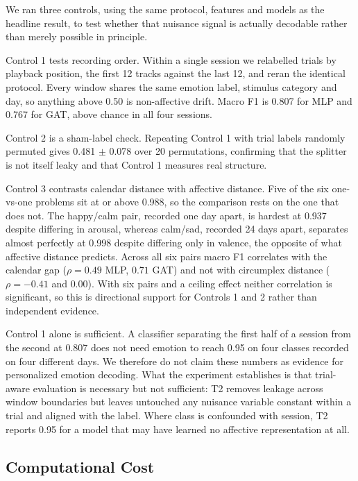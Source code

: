 \documentclass[conference,a4paper]{IEEEtran}
\begin{document}
We ran three controls, using the same protocol, features and models as the headline result, to test whether that nuisance signal is actually decodable rather than merely possible in principle.

Control 1 tests recording order. Within a single session we relabelled trials by playback position, the first 12 tracks against the last 12, and reran the identical protocol. Every window shares the same emotion label, stimulus category and day, so anything above 0.50 is non-affective drift. Macro F1 is 0.807 for MLP and 0.767 for GAT, above chance in all four sessions.

Control 2 is a sham-label check. Repeating Control 1 with trial labels randomly permuted gives 0.481 $\pm$ 0.078 over 20 permutations, confirming that the splitter is not itself leaky and that Control 1 measures real structure.

Control 3 contrasts calendar distance with affective distance. Five of the six one-vs-one problems sit at or above 0.988, so the comparison rests on the one that does not. The happy/calm pair, recorded one day apart, is hardest at 0.937 despite differing in arousal, whereas calm/sad, recorded 24 days apart, separates almost perfectly at 0.998 despite differing only in valence, the opposite of what affective distance predicts. Across all six pairs macro F1 correlates with the calendar gap ($\rho=0.49$ MLP, $0.71$ GAT) and not with circumplex distance ($\rho=-0.41$ and $0.00$). With six pairs and a ceiling effect neither correlation is significant, so this is directional support for Controls 1 and 2 rather than independent evidence.

Control 1 alone is sufficient. A classifier separating the first half of a session from the second at 0.807 does not need emotion to reach 0.95 on four classes recorded on four different days. We therefore do not claim these numbers as evidence for personalized emotion decoding. What the experiment establishes is that trial-aware evaluation is necessary but not sufficient: T2 removes leakage across window boundaries but leaves untouched any nuisance variable constant within a trial and aligned with the label. Where class is confounded with session, T2 reports 0.95 for a model that may have learned no affective representation at all.

\subsection{Computational Cost}
\label{sec:cost}
\end{document}
